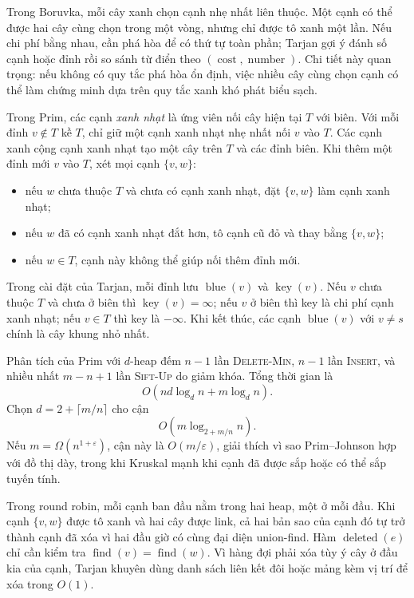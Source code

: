 \documentclass[11pt]{article}
\begin{document}
Trong Boruvka, mỗi cây xanh chọn cạnh nhẹ nhất liên thuộc. Một cạnh có thể được
hai cây cùng chọn trong một vòng, nhưng chỉ được tô xanh một lần. Nếu chi phí
bằng nhau, cần phá hòa để có thứ tự toàn phần; Tarjan gợi ý đánh số cạnh hoặc
đỉnh rồi so sánh từ điển theo \((\operatorname{cost},\operatorname{number})\).
Chi tiết này quan trọng: nếu không có quy tắc phá hòa ổn định, việc nhiều cây
cùng chọn cạnh có thể làm chứng minh dựa trên quy tắc xanh khó phát biểu sạch.

Trong Prim, các cạnh \emph{xanh nhạt} là ứng viên nối cây hiện tại \(T\) với
biên. Với mỗi đỉnh \(v\notin T\) kề \(T\), chỉ giữ một cạnh xanh nhạt nhẹ nhất
nối \(v\) vào \(T\). Các cạnh xanh cộng cạnh xanh nhạt tạo một cây trên \(T\)
và các đỉnh biên. Khi thêm một đỉnh mới \(v\) vào \(T\), xét mọi cạnh
\(\{v,w\}\):
\begin{itemize}
  \item nếu \(w\) chưa thuộc \(T\) và chưa có cạnh xanh nhạt, đặt
        \(\{v,w\}\) làm cạnh xanh nhạt;
  \item nếu \(w\) đã có cạnh xanh nhạt đắt hơn, tô cạnh cũ đỏ và thay bằng
        \(\{v,w\}\);
  \item nếu \(w\in T\), cạnh này không thể giúp nối thêm đỉnh mới.
\end{itemize}
Trong cài đặt của Tarjan, mỗi đỉnh lưu \(\operatorname{blue}(v)\) và
\(\operatorname{key}(v)\). Nếu \(v\) chưa thuộc \(T\) và chưa ở biên thì
\(\operatorname{key}(v)=\infty\); nếu \(v\) ở biên thì key là chi phí cạnh xanh
nhạt; nếu \(v\in T\) thì key là \(-\infty\). Khi kết thúc, các cạnh
\(\operatorname{blue}(v)\) với \(v\ne s\) chính là cây khung nhỏ nhất.

Phân tích của Prim với \(d\)-heap đếm \(n-1\) lần \textsc{Delete-Min},
\(n-1\) lần \textsc{Insert}, và nhiều nhất \(m-n+1\) lần \textsc{Sift-Up}
do giảm khóa. Tổng thời gian là
\[
  O(n d\log_d n + m\log_d n).
\]
Chọn \(d=2+\lceil m/n\rceil\) cho cận
\[
  O(m\log_{2+m/n}n).
\]
Nếu \(m=\Omega(n^{1+\varepsilon})\), cận này là \(O(m/\varepsilon)\), giải
thích vì sao Prim--Johnson hợp với đồ thị dày, trong khi Kruskal mạnh khi cạnh
đã được sắp hoặc có thể sắp tuyến tính.

Trong round robin, mỗi cạnh ban đầu nằm trong hai heap, một ở mỗi đầu. Khi
cạnh \(\{v,w\}\) được tô xanh và hai cây được link, cả hai bản sao của cạnh đó
tự trở thành cạnh đã xóa vì hai đầu giờ có cùng đại diện union-find. Hàm
\(\operatorname{deleted}(e)\) chỉ cần kiểm tra \(\operatorname{find}(v)=
\operatorname{find}(w)\). Vì hàng đợi phải xóa tùy ý cây ở đầu kia của cạnh,
Tarjan khuyên dùng danh sách liên kết đôi hoặc mảng kèm vị trí để xóa trong
\(O(1)\).
\end{document}
